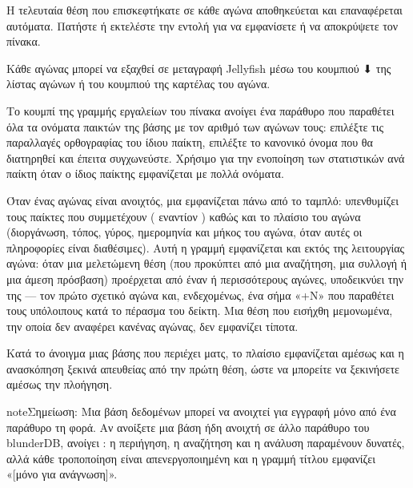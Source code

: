 \documentclass[letterpaper,10pt,greek]{sphinxmanual}
\begin{document}
\sphinxAtStartPar
Η τελευταία θέση που επισκεφτήκατε σε κάθε αγώνα αποθηκεύεται και επαναφέρεται αυτόματα. Πατήστε  ή εκτελέστε την εντολή  για να εμφανίσετε ή να αποκρύψετε τον πίνακα.

\sphinxAtStartPar
Κάθε αγώνας μπορεί να εξαχθεί σε μεταγραφή Jellyfish  μέσω του κουμπιού ⬇ της λίστας αγώνων ή του κουμπιού  της καρτέλας του αγώνα.

\sphinxAtStartPar
Το κουμπί  της γραμμής εργαλείων του πίνακα ανοίγει ένα παράθυρο που παραθέτει όλα τα ονόματα παικτών της βάσης με τον αριθμό των αγώνων τους: επιλέξτε τις παραλλαγές ορθογραφίας του ίδιου παίκτη, επιλέξτε το κανονικό όνομα που θα διατηρηθεί και έπειτα συγχωνεύστε. Χρήσιμο για την ενοποίηση των στατιστικών ανά παίκτη όταν ο ίδιος παίκτης εμφανίζεται με πολλά ονόματα.

\sphinxAtStartPar
Όταν ένας αγώνας είναι ανοιχτός, μια  εμφανίζεται πάνω από το ταμπλό: υπενθυμίζει τους παίκτες που συμμετέχουν ( εναντίον ) καθώς και το πλαίσιο του αγώνα (διοργάνωση, τόπος, γύρος, ημερομηνία και μήκος του αγώνα, όταν αυτές οι πληροφορίες είναι διαθέσιμες). Αυτή η γραμμή εμφανίζεται και εκτός της λειτουργίας αγώνα: όταν μια μελετώμενη θέση (που προκύπτει από μια αναζήτηση, μια συλλογή ή μια άμεση πρόσβαση) προέρχεται από έναν ή περισσότερους αγώνες, υποδεικνύει την  της — τον πρώτο σχετικό αγώνα και, ενδεχομένως, ένα σήμα «+N» που παραθέτει τους υπόλοιπους κατά το πέρασμα του δείκτη. Μια θέση που εισήχθη μεμονωμένα, την οποία δεν αναφέρει κανένας αγώνας, δεν εμφανίζει τίποτα.

\sphinxAtStartPar
Κατά το άνοιγμα μιας βάσης που περιέχει ματς, το πλαίσιο  εμφανίζεται αμέσως και η ανασκόπηση ξεκινά απευθείας από την πρώτη θέση, ώστε να μπορείτε να ξεκινήσετε αμέσως την πλοήγηση.

\begin{sphinxadmonition}{note}{Σημείωση:}
\sphinxAtStartPar
Μια βάση δεδομένων μπορεί να ανοιχτεί για εγγραφή μόνο από ένα παράθυρο τη φορά. Αν ανοίξετε μια βάση ήδη ανοιχτή σε άλλο παράθυρο του blunderDB, ανοίγει : η περιήγηση, η αναζήτηση και η ανάλυση παραμένουν δυνατές, αλλά κάθε τροποποίηση είναι απενεργοποιημένη και η γραμμή τίτλου εμφανίζει «{[}μόνο για ανάγνωση{]}».
\end{sphinxadmonition}
\end{document}
